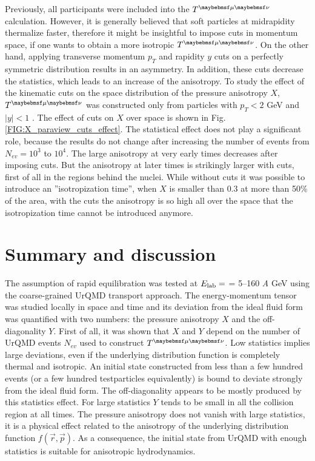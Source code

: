 Previously, all participants were included into the $\Tmn$ calculation. However, it
is generally believed that soft particles at midrapidity thermalize faster,
therefore it might be insightful to impose cuts in momentum space, if one wants
to obtain a more isotropic $\Tmn$. On the other hand, applying transverse
momentum $p_T$ and rapidity $y$ cuts on a perfectly symmetric distribution
results in an asymmetry. In addition, these cuts decrease the statistics, which
leads to an increase of the anisotropy. To study the effect of the kinematic
cuts on the space distribution of the pressure anisotropy $X$, $\Tmn$ was
constructed only from particles with $p_T < 2$ GeV and $|y| < 1$ . The effect of cuts
on $X$ over space is shown in Fig. \ref{FIG:X_paraview_cuts_effect}. The statistical
effect does not play a significant role, because the results do not change after
increasing the number of events from $N_{ev} = 10^3$ to $10^4$. The large anisotropy
at very early times decreases after imposing cuts. But the anisotropy at later times
is strikingly larger with cuts, first of all in the regions behind the nuclei. While
without cuts it was possible to introduce an ''isotropization time'', when $X$ is
smaller than $0.3$ at more than 50\% of the area, with the cuts the anisotropy is so
high all over the space that the isotropization time cannot be introduced anymore.

\section{Summary and discussion}

The assumption of rapid equilibration was tested at $E_\mathrm{lab} = $ = 5--160
\emph{A} GeV using the coarse-grained UrQMD transport approach.  The
energy-momentum tensor was studied locally in space and time and its deviation
from the ideal fluid form was quantified with two numbers: the pressure
anisotropy $X$ and the off-diagonality $Y$. First of all, it was shown that $X$
and $Y$ depend on the number of UrQMD events $N_{ev}$ used to construct $\Tmn$.
Low statistics implies large deviations, even if the underlying distribution
function is completely thermal and isotropic. An initial state constructed from
less than a few hundred events (or a few hundred testparticles equivalently) is
bound to deviate strongly from the ideal fluid form. The off-diagonality
appears to be mostly produced by this statistics effect. For large statistics
$Y$ tends to be small in all the collision region at all times. The pressure
anisotropy does not vanish with large statistics, it is a physical effect related
to the anisotropy of the underlying distribution function
$\mathit{f}(\vec{r},\vec{p})$. As a consequence, the initial state from UrQMD
with enough statistics is suitable for anisotropic hydrodynamics.

